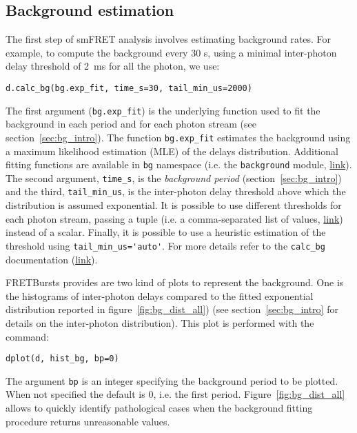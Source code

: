 \subsection{Background estimation}
\label{sec:bg_calc}

The first step of smFRET analysis involves estimating background rates.
For example, to compute the background every 30 s, using a minimal inter-photon
delay threshold of 2~ms for all the photon, we use:

\begin{lstlisting}
d.calc_bg(bg.exp_fit, time_s=30, tail_min_us=2000)
\end{lstlisting}

The first argument (\verb|bg.exp_fit|) is the underlying function used to fit the
background in each period and for each photon stream (see section~\ref{sec:bg_intro}).
The function
\verb|bg.exp_fit| estimates the background using a maximum likelihood estimation
(MLE) of the delays distribution. Additional fitting functions are available in
\verb|bg| namespace 
(i.e. the \verb|background| module, \href{http://fretbursts.readthedocs.org/en/latest/background.html}
{link}). The second argument, \verb|time_s|, is the
\textit{background period} (section~\ref{sec:bg_intro}) and the third, \verb|tail_min_us|,
is the inter-photon delay threshold above which the distribution is assumed exponential.
It is possible to use different thresholds for each photon stream, passing a
tuple (i.e. a comma-separated list of values, \href{https://docs.python.org/3.5/tutorial/datastructures.html#tuples-and-sequences}{link}) instead of a scalar.
Finally, it is possible to use a heuristic estimation of the threshold using
\verb|tail_min_us='auto'|. For more details refer to the \verb|calc_bg| documentation
(\href{http://fretbursts.readthedocs.org/en/latest/data\_class.html#fretbursts.burstlib.Data.calc_bg}{link}).

FRETBursts provides are two kind of plots to represent the background. One is the histograms
of inter-photon delays compared to the fitted exponential distribution reported in 
figure~\ref{fig:bg_dist_all}) (see section~\ref{sec:bg_intro} for details on the inter-photon distribution). 
This plot is performed with the command:

\begin{lstlisting}
dplot(d, hist_bg, bp=0)
\end{lstlisting}

The argument \verb|bp| is an integer specifying the background period to be plotted.
When not specified the default is 0, i.e. the first period.
Figure~\ref{fig:bg_dist_all} allows to quickly identify pathological cases when the 
background fitting procedure returns unreasonable values. 

